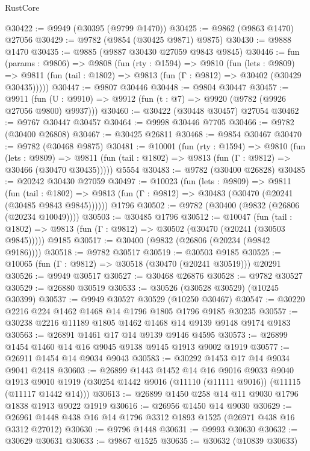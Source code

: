 \begin{lexlean}{RustCore}
\begin{coremodule}
@30422 := @9949 (@30395 (@9799 @1470))
@30425 := @9862 (@9863 @1470) @27056
@30429 := @9782 (@9854 (@30425 @9871) @9875)
@30430 := @9888 @1470
@30435 := @9885 (@9887 @30430 @27059 @9843 @9845)
@30446 := fun (params : @9806) =>
  @9808
    (fun (rty : @1594) =>
    @9810
      (fun (lets : @9809) =>
      @9811 (fun (tail : @1802) => @9813 (fun (Γ : @9812) => @30402 (@30429 @30435)))))
@30447 := @9807 @30446
@30448 := @9804 @30447
@30457 := @9911
    (fun (U : @9910) => @9912 (fun (t : @7) => @9920 (@9782 (@9926 @27056 @9800) @9937)))
@30460 := @30422 (@30448 @30457) @27054
@30462 := @9767 @30447 @30457
@30464 := @9998 @30446 @7705
@30466 := @9782 (@30400 @26808)
@30467 := @30425 @26811
@30468 := @9854 @30467
@30470 := @9782 (@30468 @9875)
@30481 := @10001
    (fun (rty : @1594) =>
    @9810
      (fun (lets : @9809) =>
      @9811 (fun (tail : @1802) => @9813 (fun (Γ : @9812) => @30466 (@30470 @30435)))))
    @5554
@30483 := @9782 (@30400 @26828)
@30485 := @20242 @30430 @27059
@30497 := @10023
    (fun (lets : @9809) =>
    @9811
      (fun (tail : @1802) =>
      @9813 (fun (Γ : @9812) => @30483 (@30470 (@20241 (@30485 @9843 @9845))))))
    @1796
@30502 := @9782 (@30400 (@9832 (@26806 (@20234 @10049))))
@30503 := @30485 @1796
@30512 := @10047
    (fun (tail : @1802) => @9813 (fun (Γ : @9812) => @30502 (@30470 (@20241 (@30503 @9845)))))
    @9185
@30517 := @30400 (@9832 (@26806 (@20234 (@9842 @9186))))
@30518 := @9782 @30517
@30519 := @30503 @9185
@30525 := @10065 (fun (Γ : @9812) => @30518 (@30470 (@20241 @30519))) @20291
@30526 := @9949 @30517
@30527 := @30468 @26876
@30528 := @9782 @30527
@30529 := @26880 @30519
@30533 := @30526 (@30528 @30529) (@10245 @30399)
@30537 := @9949 @30527 @30529 (@10250 @30467)
@30547 := @30220 @2216 @224 @1462 @1468 @14 @1796 @1805 @1796 @9185 @30235
@30557 := @30238 @2216 @11189 @1805 @1462 @1468 @14 @9139 @9148 @9174 @9183
@30563 := @26891 @1461 @17 @14 @9139 @9146 @4595
@30573 := @26899 @1454 @1460 @14 @16 @9045 @9138 @9145 @1913 @9002 @1919
@30577 := @26911 @1454 @14 @9034 @9043
@30583 := @30292 @1453 @17 @14 @9034 @9041 @2418
@30603 := @26899
    @1443
    @1452
    @14
    @16
    @9016
    @9033
    @9040
    @1913
    @9010
    @1919
    (@30254 @1442 @9016 (@11110 (@11111 @9016)) (@11115 (@11117 @1442 @14)))
@30613 := @26899 @1450 @258 @14 @11 @9030 @1796 @1838 @1913 @9022 @1919
@30616 := @26956 @1450 @14 @9030
@30629 := @26961 @1448 @438 @16 @14 @1796 @3312 @1893 @1525 (@26971 @438 @16 @3312 @27012)
@30630 := @9796 @1448
@30631 := @9993 @30630
@30632 := @30629 @30631
@30633 := @9867 @1525
@30635 := @30632 (@10839 @30633)

\end{coremodule}
\end{lexlean}
